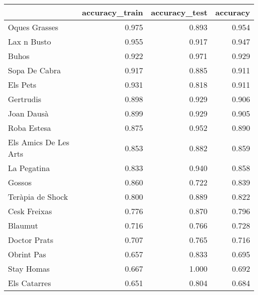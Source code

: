 \begin{tabular}{lrrr}
\toprule
{} &  accuracy\_train &  accuracy\_test &  accuracy \\
\midrule
Oques Grasses         &           0.975 &          0.893 &     0.954 \\
Lax n Busto           &           0.955 &          0.917 &     0.947 \\
Buhos                 &           0.922 &          0.971 &     0.929 \\
Sopa De Cabra         &           0.917 &          0.885 &     0.911 \\
Els Pets              &           0.931 &          0.818 &     0.911 \\
Gertrudis             &           0.898 &          0.929 &     0.906 \\
Joan Dausà            &           0.899 &          0.929 &     0.905 \\
Roba Estesa           &           0.875 &          0.952 &     0.890 \\
Els Amics De Les Arts &           0.853 &          0.882 &     0.859 \\
La Pegatina           &           0.833 &          0.940 &     0.858 \\
Gossos                &           0.860 &          0.722 &     0.839 \\
Teràpia de Shock      &           0.800 &          0.889 &     0.822 \\
Cesk Freixas          &           0.776 &          0.870 &     0.796 \\
Blaumut               &           0.716 &          0.766 &     0.728 \\
Doctor Prats          &           0.707 &          0.765 &     0.716 \\
Obrint Pas            &           0.657 &          0.833 &     0.695 \\
Stay Homas            &           0.667 &          1.000 &     0.692 \\
Els Catarres          &           0.651 &          0.804 &     0.684 \\
\bottomrule
\end{tabular}
